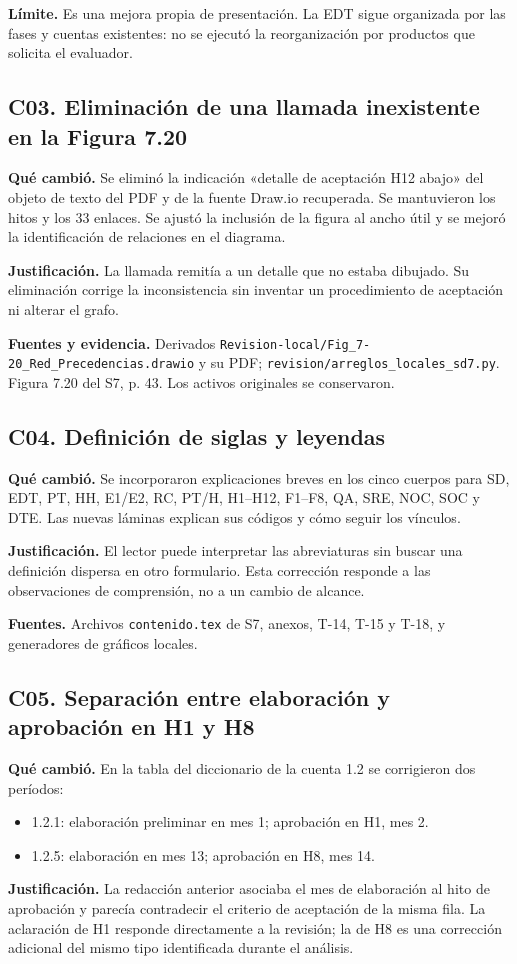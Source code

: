 \documentclass[11pt,letterpaper]{article}
\newcommand{\ruta}[1]{\nolinkurl{#1}}
\begin{document}
\textbf{Límite.} Es una mejora propia de presentación. La EDT sigue organizada
por las fases y cuentas existentes: no se ejecutó la reorganización por productos
que solicita el evaluador.

\subsection{C03. Eliminación de una llamada inexistente en la Figura 7.20}
\textbf{Qué cambió.} Se eliminó la indicación «detalle de aceptación H12 abajo»
del objeto de texto del PDF y de la fuente Draw.io recuperada. Se mantuvieron
los hitos y los 33 enlaces. Se ajustó la inclusión de la figura al ancho útil y
se mejoró la identificación de relaciones en el diagrama.

\textbf{Justificación.} La llamada remitía a un detalle que no estaba dibujado.
Su eliminación corrige la inconsistencia sin inventar un procedimiento de
aceptación ni alterar el grafo.

\textbf{Fuentes y evidencia.} Derivados
\ruta{Revision-local/Fig_7-20_Red_Precedencias.drawio} y su PDF;
\ruta{revision/arreglos_locales_sd7.py}. Figura 7.20 del S7, p. 43.
Los activos originales se conservaron.

\subsection{C04. Definición de siglas y leyendas}
\textbf{Qué cambió.} Se incorporaron explicaciones breves en los cinco cuerpos
para SD, EDT, PT, HH, E1/E2, RC, PT/H, H1--H12, F1--F8, QA, SRE, NOC, SOC y DTE.
Las nuevas láminas explican sus códigos y cómo seguir los vínculos.

\textbf{Justificación.} El lector puede interpretar las abreviaturas sin buscar
una definición dispersa en otro formulario. Esta corrección responde a las
observaciones de comprensión, no a un cambio de alcance.

\textbf{Fuentes.} Archivos \ruta{contenido.tex} de S7, anexos, T-14, T-15 y T-18,
y generadores de gráficos locales.

\subsection{C05. Separación entre elaboración y aprobación en H1 y H8}
\textbf{Qué cambió.} En la tabla del diccionario de la cuenta 1.2 se corrigieron
dos períodos:
\begin{itemize}
\item 1.2.1: elaboración preliminar en mes 1; aprobación en H1, mes 2.
\item 1.2.5: elaboración en mes 13; aprobación en H8, mes 14.
\end{itemize}
\textbf{Justificación.} La redacción anterior asociaba el mes de elaboración al
hito de aprobación y parecía contradecir el criterio de aceptación de la misma
fila. La aclaración de H1 responde directamente a la revisión; la de H8 es una
corrección adicional del mismo tipo identificada durante el análisis.
\end{document}
